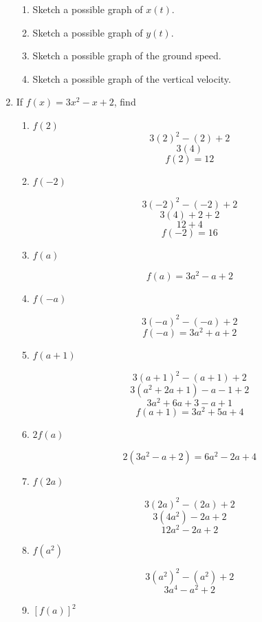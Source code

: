 \documentclass{article}
\begin{document}
\begin{enumerate}
			\begin{enumerate}
				\item Sketch a possible graph of $x(t)$.
				
				\item Sketch a possible graph of $y(t)$.
				
				\item Sketch a possible graph of the ground speed.
				
				\item Sketch a possible graph of the vertical velocity.
			\end{enumerate}
			
		\item If $f(x) = 3x^2 - x + 2$, find 
			\begin{enumerate}
				\item $f(2)$
					$$3(2)^2 - (2) + 2$$
					$$3(4)$$
					$$f(2) = 12$$
					
				\item $f(-2)$
				
					$$3(-2)^2 - (-2) + 2$$
					$$3(4) + 2 + 2 $$
					$$12 + 4$$
					$$f(-2) = 16$$
					
				\item $f(a)$
				
					$$ f(a) = 3a^2 - a + 2 $$
				
				\item $f(-a)$
				
					$$3(-a)^2 - (- a) + 2$$
					$$f(-a) = 3a^2 + a + 2$$
					
				\item $f(a+ 1)$
				
					$$3(a + 1)^2 - (a + 1) + 2$$
					$$3(a^2 + 2a + 1) - a - 1 + 2 $$
					$$3a^2 + 6a + 3 - a + 1$$
					$$f(a+1) = 3a^2 +5a + 4$$
					
				\item $2f(a)$
				
					$$2 (3a^2 - a + 2) = 6a^2 - 2a + 4$$
					
				\item $f(2a)$
				
					$$3(2a)^2 - (2a) + 2$$
					$$3(4a^2) - 2a + 2$$
					$$12a^2 - 2a + 2$$
					
				\item $f(a^2)$
				
					$$3(a^2)^2 - (a^2) + 2$$
					$$3a^4 - a^2 + 2$$
					
				\item $[f(a)]^2$
				

\end{enumerate}
\end{enumerate}
\end{document}
